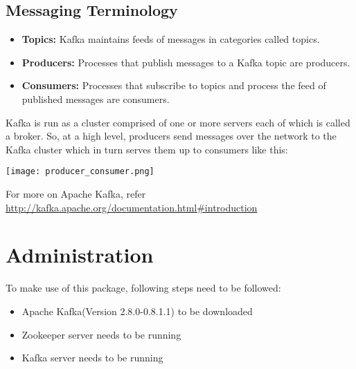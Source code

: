\documentclass[english,pdftex,a4paper]{article}
\begin{document}
\subsection{\textbf{Messaging Terminology}}
\par{
\begin{itemize}
\item{\textbf{Topics:}} Kafka maintains feeds of messages in categories called topics.
\item{\textbf{Producers:}} Processes that publish messages to a Kafka topic are producers.
\item{\textbf{Consumers:}} Processes that subscribe to topics and process the feed of published messages are consumers.
\end{itemize}
}
\par{Kafka is run as a cluster comprised of one or more servers each of which is called a broker. So, at a high level, producers send messages over the network to the Kafka cluster which in turn serves them up to consumers like this:}
\par{
\begin{center}
\texttt{[image: producer\_consumer.png]}
\end{center}
}
\par{For more on Apache Kafka, refer \url{http://kafka.apache.org/documentation.html#introduction}}

\section{Administration}
\par{To make use of this package, following steps need to be followed:}
\par{\begin{itemize}
\item{Apache Kafka(Version 2.8.0-0.8.1.1) to be downloaded}
\item{Zookeeper server needs to be running}
\item{Kafka server needs to be running}
\end{itemize}}
\end{document}
